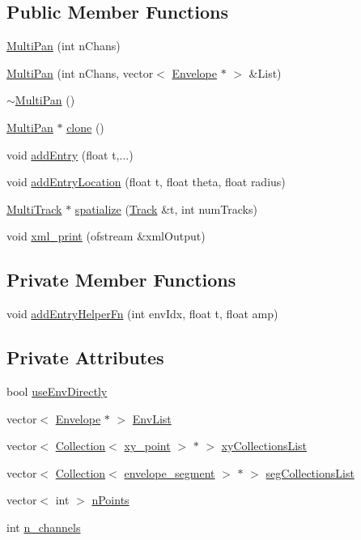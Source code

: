\subsection*{Public Member Functions}
\begin{CompactItemize}
\item 
\hyperlink{classMultiPan_a0}{Multi\-Pan} (int n\-Chans)
\item 
\hyperlink{classMultiPan_a1}{Multi\-Pan} (int n\-Chans, vector$<$ \hyperlink{classEnvelope}{Envelope} $\ast$ $>$ \&List)
\item 
\hyperlink{classMultiPan_a2}{$\sim$Multi\-Pan} ()
\item 
\hyperlink{classMultiPan}{Multi\-Pan} $\ast$ \hyperlink{classMultiPan_a3}{clone} ()
\item 
void \hyperlink{classMultiPan_a4}{add\-Entry} (float t,...)
\item 
void \hyperlink{classMultiPan_a5}{add\-Entry\-Location} (float t, float theta, float radius)
\item 
\hyperlink{classMultiTrack}{Multi\-Track} $\ast$ \hyperlink{classMultiPan_a6}{spatialize} (\hyperlink{classTrack}{Track} \&t, int num\-Tracks)
\item 
void \hyperlink{classMultiPan_a7}{xml\_\-print} (ofstream \&xml\-Output)
\end{CompactItemize}
\subsection*{Private Member Functions}
\begin{CompactItemize}
\item 
void \hyperlink{classMultiPan_d0}{add\-Entry\-Helper\-Fn} (int env\-Idx, float t, float amp)
\end{CompactItemize}
\subsection*{Private Attributes}
\begin{CompactItemize}
\item 
bool \hyperlink{classMultiPan_r0}{use\-Env\-Directly}
\item 
vector$<$ \hyperlink{classEnvelope}{Envelope} $\ast$ $>$ \hyperlink{classMultiPan_r1}{Env\-List}
\item 
vector$<$ \hyperlink{classCollection}{Collection}$<$ \hyperlink{structxy__point}{xy\_\-point} $>$ $\ast$ $>$ \hyperlink{classMultiPan_r2}{xy\-Collections\-List}
\item 
vector$<$ \hyperlink{classCollection}{Collection}$<$ \hyperlink{structenvelope__segment}{envelope\_\-segment} $>$ $\ast$ $>$ \hyperlink{classMultiPan_r3}{seg\-Collections\-List}
\item 
vector$<$ int $>$ \hyperlink{classMultiPan_r4}{n\-Points}
\item 
int \hyperlink{classMultiPan_r5}{n\_\-channels}
\end{CompactItemize}


